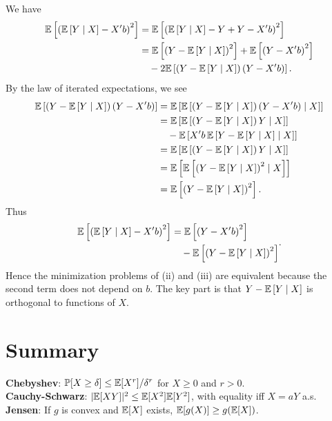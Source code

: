 \begin{theorem} \label{1-13-0}
	We have
	\begin{align*}
		\mathbb{E}\left[\left( \mathbb{E}\left[Y \mid X\right]  - X'b \right)^2\right]
		&= \mathbb{E}\left[\left(\mathbb{E}\left[Y \mid X\right]  - Y + Y - X'b\right)^2 \right] \\
		&= \mathbb{E}\left[\left(Y - \mathbb{E}\left[Y \mid X\right]\right)^2\right] + \mathbb{E}\left[\left(Y - X'b\right)^2\right] \\
		&\quad - 2\mathbb{E}\left[\left( Y - \mathbb{E}\left[Y \mid X\right]  \right)\left( Y - X'b \right)\right]
	.\end{align*}
	By the law of iterated expectations, we see
	\begin{align*}
		\mathbb{E}\left[\left( Y - \mathbb{E}\left[Y \mid X\right]  \right)\left( Y - X'b \right)\right]
		&= \mathbb{E}\left[\mathbb{E}\left[\left( Y - \mathbb{E}\left[Y \mid X\right]  \right)\left( Y - X'b \right)\mid X\right]\right] \\
		&= \mathbb{E}\left[\mathbb{E}\left[\left( Y - \mathbb{E}\left[Y \mid X\right]  \right)Y\mid X\right]\right] \\
		&\quad - \mathbb{E}\left[X' b\, \mathbb{E}\left[ Y - \mathbb{E}\left[Y \mid X\right]\mid X\right]\right] \\
		&= \mathbb{E}\left[\mathbb{E}\left[\left( Y - \mathbb{E}\left[Y \mid X\right]  \right)Y\mid X\right]\right] \\
		&= \mathbb{E}\left[\mathbb{E}\left[\left( Y - \mathbb{E}\left[Y \mid X\right]\right)^2\mid X\right]\right] \\
		&= \mathbb{E}\left[\left( Y - \mathbb{E}\left[Y \mid X\right]\right)^2\right]
	.\end{align*}
	Thus
	\[
		\begin{aligned}
			\mathbb{E}\left[\left( \mathbb{E}\left[Y \mid X\right] - X'b \right)^2\right]
			&= \mathbb{E}\left[\left(Y-X'b\right)^2\right] \\
			&\quad - \mathbb{E}\left[\left( Y - \mathbb{E}\left[Y \mid X\right]\right)^2\right]
		\end{aligned}
	.\]
	Hence the minimization problems of (ii) and (iii) are equivalent because the second term does not depend on $b$. The key part is that $Y - \mathbb{E}\left[Y \mid X\right]$ is orthogonal to functions of $X$.
	\end{theorem}



\section{Summary}

\begin{remark}
	\leavevmode\hfill\break
	\textbf{Chebyshev}: $\mathbb{P}[X\ge\delta]\le \mathbb{E}[X^r]/\delta^r$ for $X\ge 0$ and $r>0$. \\
	\textbf{Cauchy-Schwarz}: $|\mathbb{E}[XY]|^2\le\mathbb{E}[X^2]\mathbb{E}[Y^2]$, with equality iff $X=aY$ a.s. \\
	\textbf{Jensen}: If $g$ is convex and $\mathbb{E}[X]$ exists, $\mathbb{E}[g(X)]\ge g(\mathbb{E}[X])$.
\end{remark}

